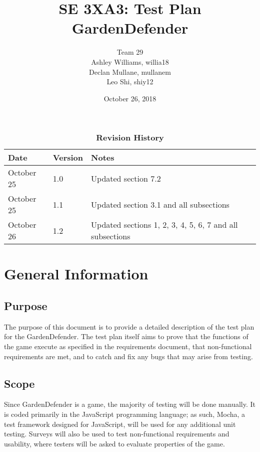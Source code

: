 \documentclass[12pt, titlepage]{article}
\title{SE 3XA3: Test Plan\\GardenDefender}
\author{Team 29
		\\ Ashley Williams, willia18
		\\ Declan Mullane, mullanem
		\\ Leo Shi, shiy12
}
\date{October 26, 2018}
\begin{document}
\maketitle

\tableofcontents
\listoftables
\listoffigures

\begin{table}[bp]
\caption{\bf Revision History}
\begin{tabularx}{\textwidth}{p{3cm}p{2cm}X}
\toprule {\bf Date} & {\bf Version} & {\bf Notes}\\
\midrule
October 25 & 1.0 & Updated section 7.2\\
October 25 & 1.1 & Updated section 3.1 and all subsections\\
October 26 & 1.2 & Updated sections 1, 2, 3, 4, 5, 6, 7 and all subsections\\
\bottomrule
\end{tabularx}
\end{table}

\newpage



\section{General Information}

\subsection{Purpose}

The purpose of this document is to provide a detailed description of the test plan for the  GardenDefender. The test plan itself aims to prove that the functions of the game execute as specified in the requirements document, that non-functional requirements are met, and to catch and fix any bugs that may arise from testing. 

\subsection{Scope}

Since GardenDefender is a game, the majority of testing will be done manually. It is coded primarily in the JavaScript programming language; as such, Mocha, a test framework designed for JavaScript, will be used for any additional unit testing. Surveys will also be used to test non-functional requirements and usability, where testers will be asked to evaluate properties of the game. 
\end{document}
